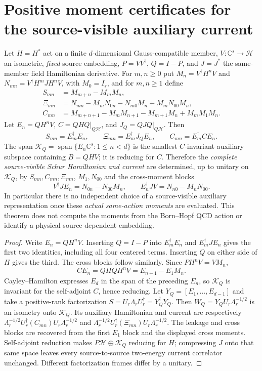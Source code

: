 \documentclass[12pt,a4paper]{article}
\begin{document}
\section{Positive moment certificates for the source-visible auxiliary current}
\label{p10:sec:v377-positive-moment-Schur}
\begin{theorem}
\label{p10:thm:v377-auxiliary-krylov-centering}
Let $H=H^*$ act on a finite $d$-dimensional Gauss-compatible member,
$V:\mathbb C^s\to\mathcal H$ an isometric, \emph{fixed} source embedding,
$P=VV^\dagger$, $Q=I-P$, and $J=J^*$ the same-member field
Hamiltonian derivative.  For $m,n\ge0$ put
$M_n=V^\dagger H^nV$ and $N_{mn}=V^\dagger H^mJH^nV$,
with $M_0=I_s$, and for $m,n\ge1$ define
\[
\boxed{\begin{aligned}
S_{mn}&=M_{m+n}-M_mM_n,\\
\Xi_{mn}&=N_{mn}-M_mN_{0n}-N_{m0}M_n+M_mN_{00}M_n,\\
C_{mn}&=M_{m+n+1}-M_mM_{n+1}-M_{m+1}M_n+M_mM_1M_n.
\end{aligned}}
\]
Let $E_n=QH^nV$, $C=QHQ|_{Q\mathcal H}$, and $J_Q=QJQ|_{Q\mathcal H}$. Then
\[
 \boxed{S_{mn}=E_m^\dagger E_n,\qquad
 \Xi_{mn}=E_m^\dagger J_QE_n,\qquad
 C_{mn}=E_m^\dagger CE_n.}
\]
The span $\mathcal K_Q=\operatorname{span}\{E_n\mathbb C^s:1\le n<d\}$
is the smallest $C$-invariant auxiliary subspace containing $B=QHV$;
it is reducing for $C$. Therefore the \emph{complete source-visible Schur
Hamiltonian and current} are determined, up to unitary on $\mathcal K_Q$,
by $S_{mn},C_{mn},\Xi_{mn}$, $M_1,N_{00}$ and the cross-moment blocks
\[
 V^\dagger J E_n=N_{0n}-N_{00}M_n,\qquad
 E_n^\dagger J V=N_{n0}-M_nN_{00}.
\]
In particular there is no independent choice of a source-visible
auxiliary representation once these \emph{actual same-action moments}
are evaluated. This theorem does not compute the moments from the
Born--Hopf QCD action or identify a physical source-dependent embedding.
\end{theorem}
\begin{proof}
Write $E_n=QH^nV$. Inserting $Q=I-P$ into
$E_m^\dagger E_n$ and $E_m^\dagger JE_n$ gives the
first two identities, including all four centered terms.  Inserting
$Q$ on either side of $H$ gives the third.  The cross blocks follow
similarly.  Since $P H^nV=VM_n$,
\[
 CE_n=QHQH^nV=E_{n+1}-E_1M_n.
\]
Cayley--Hamilton expresses $E_d$ in the span of the preceding $E_n$,
so $\mathcal K_Q$ is invariant for the self-adjoint $C$, hence reducing.
Let $Y_Q=[E_1,\ldots,E_{d-1}]$ and take a positive-rank
factorization $S=U_r\Lambda_rU_r^\dagger=Y_Q^\dagger Y_Q$.
Then $W_Q=Y_QU_r\Lambda_r^{-1/2}$ is an isometry onto
$\mathcal K_Q$.  Its auxiliary Hamiltonian and current are respectively
$\Lambda_r^{-1/2}U_r^\dagger(C_{mn})U_r\Lambda_r^{-1/2}$ and
$\Lambda_r^{-1/2}U_r^\dagger(\Xi_{mn})U_r\Lambda_r^{-1/2}$.
The leakage and cross blocks are recovered from the first $E_1$ block
and the displayed cross moments.  Self-adjoint reduction makes
$P\mathcal H\oplus\mathcal K_Q$ reducing for $H$; compressing $J$ onto
that same space leaves every source-to-source two-energy current
correlator unchanged.  Different factorization frames differ by a unitary.
\end{proof}
\end{document}
